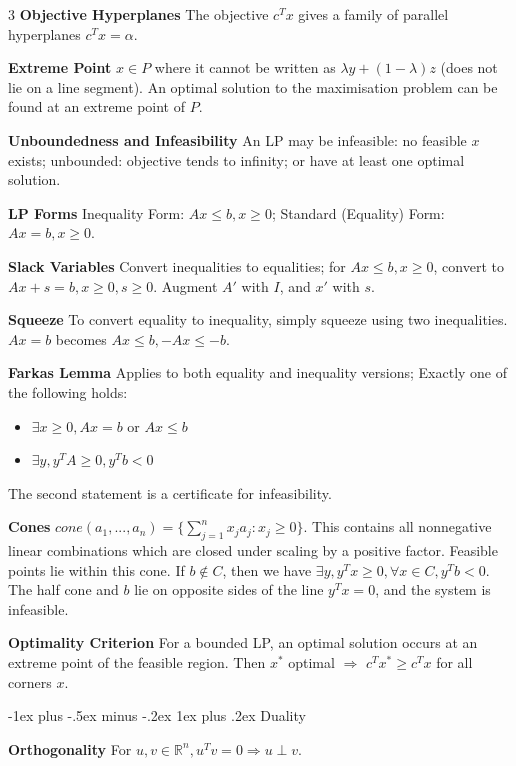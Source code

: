 \documentclass[10pt, landscape]{article}
\makeatletter
\renewcommand{\subsection}{\@startsection{subsection}{3}{0mm}%
                                {-1ex plus -.5ex minus -.2ex}%
                                {1ex plus .2ex}%
                                {\normalfont\small\bfseries}}%
\makeatother
\begin{document}
\begin{multicols*}{3}
\textbf{Objective Hyperplanes} The objective $c^Tx$ gives a family of parallel hyperplanes $c^Tx=\alpha$.

\textbf{Extreme Point} $x \in P$ where it cannot be written as $\lambda y + (1-\lambda)z$ (does not lie on a line segment). An optimal solution to the maximisation problem can be found at an extreme point of $P$.

\textbf{Unboundedness and Infeasibility} An LP may be infeasible: no feasible $x$ exists; unbounded: objective tends to infinity; or have at least one optimal solution.

\textbf{LP Forms} Inequality Form: $Ax \leq b, x \geq 0$; Standard (Equality) Form: $Ax=b, x \geq 0$.

\textbf{Slack Variables} Convert inequalities to equalities; for $Ax \leq b, x \geq 0$, convert to $Ax+s=b, x \geq 0, s \geq 0$. Augment $A'$ with $I$, and $x'$ with $s$.

\textbf{Squeeze} To convert equality to inequality, simply squeeze using two inequalities. $Ax=b$ becomes $Ax \leq b, -Ax \leq -b$.

\textbf{Farkas Lemma} Applies to both equality and inequality versions; Exactly one of the following holds:
\begin{itemize}
    \item $\exists x \geq 0, Ax =b$ or $Ax \leq b$
    \item $\exists y, y^TA \geq 0, y^Tb < 0$
\end{itemize}
The second statement is a certificate for infeasibility.

\textbf{Cones} $cone(a_1,...,a_n)=\{\sum_{j=1}^nx_ja_j: x_j \geq 0\}$. This contains all nonnegative linear combinations which are closed under scaling by a positive factor. Feasible points lie within this cone. If $b \notin C$, then we have $\exists y, y^Tx \geq 0, \forall x \in C, y^Tb < 0$. The half cone and $b$ lie on opposite sides of the line $y^Tx=0$, and the system is infeasible.

\textbf{Optimality Criterion} For a bounded LP, an optimal solution occurs at an extreme point of the feasible region. Then $x^*$ optimal $\Rightarrow$ $c^Tx^* \geq c^Tx$ for all corners $x$.

\subsection{Duality}

\textbf{Orthogonality} For $u,v \in \mathbb{R}^n, u^Tv=0 \Rightarrow u \perp v$.


\end{multicols*}
\end{document}
